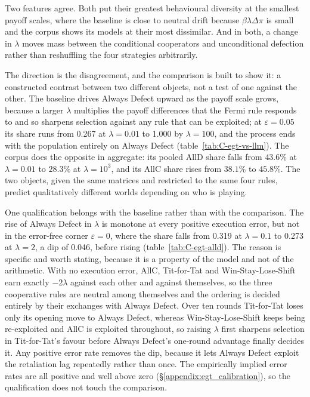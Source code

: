 \documentclass[11pt,a4paper]{article}
\newcommand{\lam}{\lambda}
\newcommand{\rev}[1]{{\color{red}#1}}
\newcommand{\rev}[1]{#1}
\begin{document}
Two features agree. Both put their greatest behavioural diversity at the smallest payoff scales, where the baseline is close to neutral drift because $\beta \lam \Delta\pi$ is small and the corpus shows its models at their most dissimilar. And in both, a change in $\lam$ moves mass between the conditional cooperators and unconditional defection rather than reshuffling the four strategies arbitrarily.

The direction is the disagreement, \rev{and the comparison is built to show it: a constructed contrast between two different objects, not a test of one against the other.} The baseline drives Always Defect upward as the payoff scale grows, because a larger $\lam$ multiplies the payoff differences that the Fermi rule responds to and so sharpens selection against any rule that can be exploited; at $\varepsilon = 0.05$ its share runs from 0.267 at $\lam = 0.01$ to 1.000 by $\lam = 100$, and the process ends with the population entirely on Always Defect (table~\ref{tab:C-egt-vs-llm}). The corpus does the opposite in aggregate: its pooled AllD share falls from $43.6\%$ at $\lam = 0.01$ to $28.3\%$ at $\lam = 10^{3}$, and its AllC share rises from $38.1\%$ to $45.8\%$. The two objects, given the same matrices and restricted to the same four rules, predict qualitatively different worlds depending on who is playing.

One qualification belongs with the baseline rather than with the comparison. The rise of Always Defect in $\lam$ is monotone at every positive execution error, but not in the error-free corner $\varepsilon = 0$, where the share falls from 0.319 at $\lam = 0.1$ to 0.273 at $\lam = 2$, a dip of 0.046, before rising (table~\ref{tab:C-egt-alld}). The reason is specific and worth stating, because it is a property of the model and not of the arithmetic. With no execution error, AllC, Tit-for-Tat and Win-Stay-Lose-Shift earn exactly $-2\lam$ against each other and against themselves, so the three cooperative rules are neutral among themselves and the ordering is decided entirely by their exchanges with Always Defect. Over ten rounds Tit-for-Tat loses only its opening move to Always Defect, whereas Win-Stay-Lose-Shift keeps being re-exploited and AllC is exploited throughout, so raising $\lam$ first sharpens selection in Tit-for-Tat's favour before Always Defect's one-round advantage finally decides it. Any positive error rate removes the dip, because it lets Always Defect exploit the retaliation lag repeatedly rather than once. The empirically implied error rates are all positive and well above zero (\S\ref{appendix:egt_calibration}), so the qualification does not touch the comparison.
\end{document}

